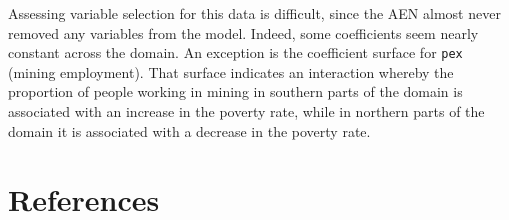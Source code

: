 \documentclass[authoryear, review, 11pt]{elsarticle}
\begin{document}
	Assessing variable selection for this data is difficult, since the AEN almost never removed any variables from the model. Indeed, some coefficients seem nearly constant across the domain. An exception is the coefficient surface for \verb!pex! (mining employment). That surface indicates an interaction whereby the proportion of people working in mining in southern parts of the domain is associated with an increase in the poverty rate, while in northern parts of the domain it is associated with a decrease in the poverty rate.


\section{References}


\end{document}
